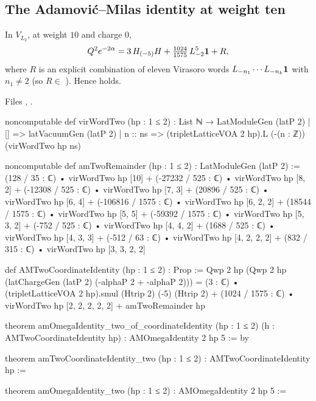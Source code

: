 \subsection{The Adamovi\'c--Milas identity at weight ten}

\begin{theorem}[The $p=2$ identity]\label{l18:thm:AMtwo}
In $V_{L_2}$, at weight $10$ and charge $0$,
\begin{equation*}
Q^2e^{-2\alpha}=3\,H_{(-5)}H+\tfrac{1024}{1575}\,L_{-2}^5\mathbf{1}+R,
\end{equation*}
where $R$ is an explicit combination of eleven Virasoro words $L_{-n_1}\cdots L_{-n_k}\mathbf{1}$ with
$n_1\ne2$ (so $R\in$ ). Hence  holds.
\end{theorem}
\noindent Files ,
.
\begin{leancode}
noncomputable def virWordTwo (hp : 1 ≤ 2) : List ℕ → LatModuleGen (latP 2)
  | [] => latVacuumGen (latP 2)
  | n :: ns => (tripletLatticeVOA 2 hp).L (-(n : ℤ)) (virWordTwo hp ns)

noncomputable def amTwoRemainder (hp : 1 ≤ 2) : LatModuleGen (latP 2) :=
    (128 / 35 : ℂ) • virWordTwo hp [10]
  + (-27232 / 525 : ℂ) • virWordTwo hp [8, 2]
  + (-12308 / 525 : ℂ) • virWordTwo hp [7, 3]
  + (20896 / 525 : ℂ) • virWordTwo hp [6, 4]
  + (-106816 / 1575 : ℂ) • virWordTwo hp [6, 2, 2]
  + (18544 / 1575 : ℂ) • virWordTwo hp [5, 5]
  + (-59392 / 1575 : ℂ) • virWordTwo hp [5, 3, 2]
  + (-752 / 525 : ℂ) • virWordTwo hp [4, 4, 2]
  + (1688 / 525 : ℂ) • virWordTwo hp [4, 3, 3]
  + (-512 / 63 : ℂ) • virWordTwo hp [4, 2, 2, 2]
  + (832 / 315 : ℂ) • virWordTwo hp [3, 3, 2, 2]

def AMTwoCoordinateIdentity (hp : 1 ≤ 2) : Prop :=
  Qwp 2 hp (Qwp 2 hp
      (latChargeGen (latP 2) (-alphaP 2 + -alphaP 2)))
    = (3 : ℂ) • (tripletLatticeVOA 2 hp).smul (Htrip 2) (-5) (Htrip 2)
      + (1024 / 1575 : ℂ) • virWordTwo hp [2, 2, 2, 2, 2]
      + amTwoRemainder hp
\end{leancode}
\begin{leancode}
theorem amOmegaIdentity_two_of_coordinateIdentity (hp : 1 ≤ 2)
    (h : AMTwoCoordinateIdentity hp) : AMOmegaIdentity 2 hp 5 := by

theorem amTwoCoordinateIdentity_two (hp : 1 ≤ 2) : AMTwoCoordinateIdentity hp :=

theorem amOmegaIdentity_two (hp : 1 ≤ 2) : AMOmegaIdentity 2 hp 5 :=
\end{leancode}
